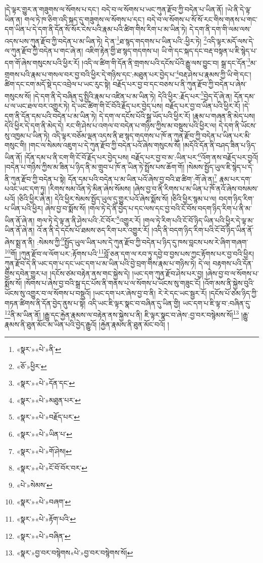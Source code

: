 །དེ་ལྟར་གྱུར་ན་གཟུགས་ལ་སོགས་པ་དང་། བདེ་བ་ལ་སོགས་པ་ཡང་ཀུན་རྫོབ་ཀྱི་བདེན་པ་ཡིན་ནོ། །ཡེ་ནི་དེ་ལྟ་ཡིན་ན། གལ་ཏེ་ཁ་ཅིག་འདི་སྐད་དུ་གཟུགས་ལ་སོགས་པ་དང་། བདེ་བ་ལ་སོགས་པ་སོ་སོ་རང་གིས་གནས་པ་གང་དག་ཡིན་པ་དེ་དག་ནི་དོན་སོ་སོར་ངེས་པའི་རྣམ་པའི་ཚིག་གིས་རིག་པ་མ་ཡིན་ཏེ། དེ་དག་ནི་དག་གི་ལམ་ལས་འདས་པས་ཀུན་རྫོབ་ཀྱི་བདེན་པ་མ་ཡིན་ཏེ། དེ་ན་\footnote{«སྣར་»«པེ་»ནི་}ཐ་སྙད་གདགས་པ་ཡིན་པའི་:ཕྱིར་ཏེ། \footnote{«ཅོ་»ཕྱིར་}འདི་ལྟར་མདོ་ལས་དེ་ལ་ཀུན་རྫོབ་ཀྱི་བདེན་པ་གང་ཞེ་ན། འཇིག་རྟེན་གྱི་ཐ་སྙད་གདགས་པ། ཡི་གེ་དང་སྐད་དང་བརྡ་བསྟན་པ་ཇི་སྙེད་པ་དག་གོ་ཞེས་གསུངས་པའི་ཕྱིར་རོ། །འདི་ལ་ཚིག་གི་དོན་ནི་གྲགས་པའི་དངོས་པོའི་རྒྱུ་ལས་བྱུང་བ། སྒྲ་དང་དོན་\footnote{«སྣར་»«པེ་»དོན་དང་}མ་གྲགས་པའི་རྣམ་པ་གསལ་བར་བྱ་བའི་ཕྱིར་དེ་གཉིས་དང་:མཐུན་པར་བྱེད་པ་\footnote{«སྣར་»«པེ་»མཐུན་པར་}བརྡ་ཤེས་པ་རྣམས་ཀྱི་ཡི་གེ་དང་། ཚིག་དང་ངག་མདོ་སྡེ་དང་འབྲེལ་པ་ཡང་རུང་སྟེ། བརྗོད་པར་བྱ་བ་དང་བཅས་པ་ནི་ཀུན་རྫོབ་ཀྱི་བདེན་པ་ཞེས་གསུངས་སོ། །དེ་དག་ནི་དེ་བཞིན་དུ་སྤྱིའི་རྣམ་པ་འཛིན་པ་མ་ཡིན་ཏེ། དེའི་ཕྱིར་:རྗོད་པར་\footnote{«སྣར་»«པེ་»བརྗོད་པར་}བྱེད་དོ་ཞེ་ན། དོན་དམ་པ་ལ་ཡང་ཐལ་བར་འགྱུར་ཏེ། དེ་ཡང་ཚིག་གི་ངོ་བོའི་རྗོད་པར་བྱེད་པས། བརྗོད་པར་བྱ་བ་ཡིན་པའི་ཕྱིར་རོ། །དེ་དག་ནི་དོན་དམ་པའི་བདེན་པ་མ་ཡིན་ཏེ། དེ་དག་ལ་དངོས་པོའི་སྒྲ་ཡོད་པའི་ཕྱིར་རོ། །རྣམ་པ་གཞན་ནི་མེད་པས། དེའི་ཕྱིར་དེ་དག་ནི་མེད་དེ། རང་གི་ཤེས་པ་འགལ་བ་བདེན་པ་གཉིས་ཀྱིས་མ་བསྡུས་པའི་ཕྱིར་ལ། དེ་དག་ནི་ཡོངས་སུ་འཁྱམ་པ་ཡིན་ཏེ། འདི་ལྟར་བཅོམ་ལྡན་འདས་ནི་ཐ་སྙད་གདགས་པ་ཁོ་ན་ཀུན་རྫོབ་ཀྱི་བདེན་པ་ཡིན་པར་མི་གསུང་གི། །གང་ལ་སེམས་འཇུག་པ་དེ་ཀུན་རྫོབ་ཀྱི་བདེན་པའོ་ཞེས་གསུངས་སོ། །མདོའི་དོན་ནི་བཤད་ཟིན་པ་ཉིད་ཡིན་ནོ། །དོན་དམ་པ་ནི་ངག་གི་ངོ་བོ་རྗོད་པར་བྱེད་པས། བརྗོད་པར་བྱ་བ་མ་:ཡིན་པར་\footnote{«སྣར་»«པེ་»ཡིན་པ་}འོག་ནས་བརྗོད་པར་བྱའོ། །བདེན་པ་གཉིས་ཀྱིས་མ་ཟིན་པ་ཉིད་ནི་མ་གྲུབ་པ་ཁོ་ན་ཡིན་ཏེ་སྤྲོས་པས་ཆོག་གོ། །སེམས་སྤྱོད་ཡུལ་ཇི་སྙེད་པ་དེ་ནི་ཀུན་རྫོབ་ཀྱི་བདེན་པ་སྟེ། དོན་དམ་པའི་བདེན་པ་མ་ཡིན་པའོ་ཞེས་བྱ་བའི་ཐ་ཚིག་:གོ་ཞེ་ན།\footnote{«སྣར་»«པེ་»གོ་ཤེས།} རྣམ་པར་དག་པའང་ཡང་དག་ཏུ། །རིགས་སམ་འོན་ཏེ་མིན་ཞེས་སོམས། །ཞེས་བྱ་བ་ནི་རིགས་པ་མ་ཡིན་པ་ཁོ་ནའོ་ཞེས་བསམས་པའོ། །ཅིའི་ཕྱིར་ཞེ་ན། དེའི་ཕྱིར་སེམས་སྤྱོད་ཡུལ་དུ་གྱུར་པའོ་ཞེས་སྨོས་སོ། །ཅིའི་ཕྱིར་སྙམ་པ་ལ། བདག་ཉིད་རིག་པ་ཡིན་པའི་ཕྱིར། ཞེས་བྱ་བ་སྨོས་སོ། །གལ་ཏེ་དེ་ནི་བྱེད་པ་དང་ལས་དང་བྱ་བའི་ངོ་བོས་བདག་ཉིད་རིག་པ་ནི་མ་ཡིན་ནོ་ཞེ་ན། གལ་ཏེ་དེ་ལྟ་ན་ནི་ཤེས་པའི་:ངོ་བོར་\footnote{«སྣར་»«པེ་»ངོ་བོ་བོར་བར་}འགྱུར་རོ། །གལ་ཏེ་རིག་པའི་ངོ་བོ་ཉིད་ཡིན་པའི་ཕྱིར་དེ་ལྟ་མ་ཡིན་ནོ་ཞེ་ན། འོ་ན་ནི་དེ་དངོས་པོ་ཐམས་ཅད་རིག་པར་འགྱུར་རོ། །འདི་ནི་བདག་ཉིད་རིག་པའི་ངོ་བོ་ཉིད་ཡིན་ནོ་ཞེས་སྨྲ་ན་ནི། :སེམས་ཀྱི་\footnote{«པེ་»སེམས་}སྤྱོད་ཡུལ་ཡིན་པས་དེ་ཀུན་རྫོབ་ཀྱི་བདེན་པ་ཉིད་དུ་ཁས་བླངས་པས་རེ་ཞིག་གཞག་\footnote{«སྣར་»«པེ་»བཞག་}གོ། །ཀུན་རྫོབ་ལ་ལོག་པར་:རྟོགས་པའི་\footnote{«སྣར་»«པེ་»རྟོག་པའི་}བློ་ཅན་དག་ལ་རབ་ཏུ་དབྱེ་བ་བྱས་པས་ཀྱང་རྟོགས་པར་བྱ་བའི་ཕྱིར། ཀུན་རྫོབ་དེ་ནི་ཡང་དག་པ་དང་ཡང་དག་པ་མ་ཡིན་པའི་བྱེ་བྲག་གིས་རྣམ་པ་གཉིས་ཏེ། དེ་ལ། བརྟགས་པའི་དོན་གྱིས་དབེན་གྱུར་པ། །དངོས་ཙམ་བརྟེན་ནས་གང་སྐྱེས་དེ། །ཡང་དག་ཀུན་རྫོབ་ཤེས་པར་བྱ། །ཞེས་བྱ་བ་ལ་སོགས་པ་སྨོས་སོ། །སོགས་པ་ཞེས་བྱ་བའི་སྒྲ་དང་པོས་ནི་གནས་པ་ལ་སོགས་པ་ཡོངས་སུ་གཟུང་ངོ། །འོག་མས་ནི་སྐྱེས་བུའི་ཡོངས་སུ་འགྱུར་བ་ལ་སོགས་པ་བསྡུའོ། །ཡང་དག་པར་ཞེས་བྱ་བ་ནི། རེ་རེ་དང་ཡང་སྦྱར་རོ། །དངོས་པོ་ཙམ་ཉིད་ཀྱི་གཏན་ཚིགས་ནི་དོན་བྱེད་ནུས་པ་སྟེ། འདི་ཡང་ཇི་ལྟར་སྣང་བ་བཞིན་དུ་ཡིན་གྱི། ཡང་དག་པ་ཇི་ལྟ་བ་:བཞིན་དུ་\footnote{«སྣར་»«པེ་»བཞིན་}ནི་མ་ཡིན་ནོ། །རྒྱུ་དང་རྐྱེན་རྣམས་ལ་བརྟེན་ནས་སྐྱེས་པ་ནི། ཇི་ལྟར་སྣང་བ་ཞེས་:བྱ་བར་བསྙེམས་སོ།\footnote{«སྣར་»བྱ་བར་བསྙེགས«པེ་»བྱ་བར་བསྙེགས་སོ།} །རྒྱུ་རྣམས་ནི་ཐུན་མོང་མ་ཡིན་པའི་བྱེད་རྒྱུའོ། །རྐྱེན་རྣམས་ནི་ཐུན་མོང་བའོ། །
